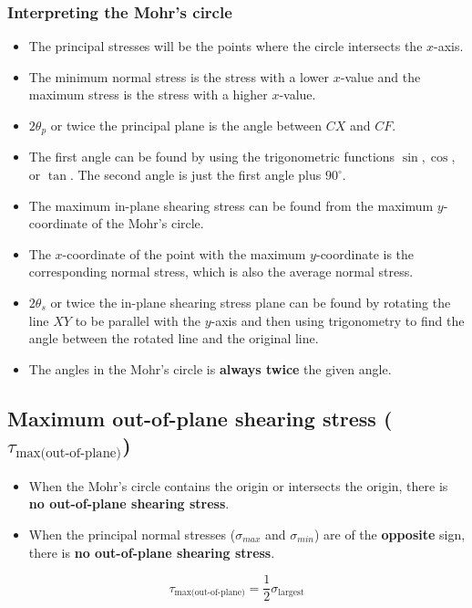 \documentclass[11pt]{article}
\begin{document}
\subsubsection{Interpreting the Mohr's circle}
\label{sec:org30c335d}
\begin{itemize}
\item The principal stresses will be the points where the circle intersects the \(x\)-axis.
\item The minimum normal stress is the stress with a lower \(x\)-value and the maximum stress is the stress with a higher \(x\)-value.
\item \(2\theta_p\) or twice the principal plane is the angle between \(CX\) and \(CF\).
\item The first angle can be found by using the trigonometric functions \(\sin, \cos\), or \(\tan\). The second angle is just the first angle plus \(90^{\circ}\).
\item The maximum in-plane shearing stress can be found from the maximum \(y\)-coordinate of the Mohr's circle.
\item The \(x\)-coordinate of the point with the maximum \(y\)-coordinate is the corresponding normal stress, which is also the average normal stress.
\item \(2 \theta_s\) or twice the in-plane shearing stress plane can be found by rotating the line \(XY\) to be parallel with the \(y\)-axis and then using trigonometry to find the angle between the rotated line and the original line.
\item The angles in the Mohr's circle is \textbf{always twice} the given angle.
\end{itemize}

\subsection{Maximum out-of-plane shearing stress (\(\tau_{\text{max(out-of-plane)}}\))}
\label{sec:org16a9b9f}
\begin{itemize}
\item When the Mohr's circle contains the origin or intersects the origin, there is \textbf{no out-of-plane shearing stress}.
\item When the principal normal stresses (\(\sigma_{max}\) and \(\sigma_{min}\)) are of the \textbf{opposite} sign, there is \textbf{no out-of-plane shearing stress}.
\end{itemize}

\[\tau_{\text{max(out-of-plane)}} = \frac{1}{2} \sigma_{\text{largest}}\]
\end{document}
